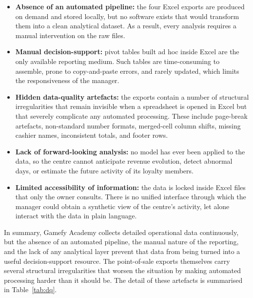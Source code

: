 \documentclass[12pt, a4paper]{report}
\begin{document}
\begin{itemize}
  \item \textbf{Absence of an automated pipeline:} the four Excel exports
        are produced on demand and stored locally, but no software exists
        that would transform them into a clean analytical dataset. As a
        result, every analysis requires a manual intervention on the raw
        files.
  \item \textbf{Manual decision-support:} pivot tables built ad hoc inside
        Excel are the only available reporting medium. Such tables are
        time-consuming to assemble, prone to copy-and-paste errors, and
        rarely updated, which limits the responsiveness of the manager.
  \item \textbf{Hidden data-quality artefacts:} the exports contain a
        number of structural irregularities that remain invisible when a
        spreadsheet is opened in Excel but that severely complicate any
        automated processing. These include page-break artefacts,
        non-standard number formats, merged-cell column shifts, missing
        cashier names, inconsistent totals, and footer rows.
  \item \textbf{Lack of forward-looking analysis:} no model has ever been
        applied to the data, so the centre cannot anticipate revenue
        evolution, detect abnormal days, or estimate the future activity of
        its loyalty members.
  \item \textbf{Limited accessibility of information:} the data is locked
        inside Excel files that only the owner consults. There is no
        unified interface through which the manager could obtain a
        synthetic view of the centre's activity, let alone interact with
        the data in plain language.
\end{itemize}

In summary, Gamefy Academy collects detailed operational data continuously,
but the absence of an automated pipeline, the manual nature of the
reporting, and the lack of any analytical layer prevent that data from
being turned into a useful decision-support resource. The point-of-sale
exports themselves carry several structural irregularities that worsen the
situation by making automated processing harder than it should be. The
detail of these artefacts is summarised in Table~\ref{tab:dq}.
\end{document}
